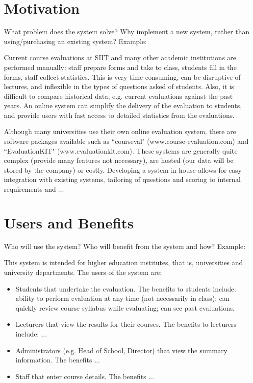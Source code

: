 \documentclass[12pt, a4paper]{report}
\begin{document}
\section{Motivation}
\label{sec:motivation}

What problem does the system solve? Why implement a new system, rather than using/purchasing an existing system? Example:

Current course evaluations at SIIT and many other academic institutions are performed manually: staff prepare forms and take to class, students fill in the forms, staff collect statistics. This is very time consuming, can be disruptive of lectures, and inflexible in the types of questions asked of students. Also, it is difficult to compare historical data, e.g. current evaluations against the past years. An online system can simplify the delivery of the evaluation to students, and provide users with fast access to detailed statistics from the evaluations.

Although many universities use their own online evaluation system, there are software packages available such as ``courseval" (www.course-evaluation.com) and ``EvaluationKIT" (www.evaluationkit.com). These systems are generally quite complex (provide many features not necessary), are hosted (our data will be stored by the company) or costly. Developing a system in-house allows for easy integration with existing systems, tailoring of questions and scoring to internal requirements and ...

\section{Users and Benefits}
\label{sec:users}

Who will use the system? Who will benefit from the system and how? Example:

This system is intended for higher education institutes, that is, universities and university departments. The users of the system are:

\begin{itemize}
	\item Students that undertake the evaluation. The benefits to students include: ability to perform evaluation at any time (not necessarily in class); can quickly review course syllabus while evaluating; can see past evaluations.
	\item Lecturers that view the results for their courses. The benefits to lecturers include: ...
	\item Administrators (e.g. Head of School, Director) that view the summary information. The benefits ...
	\item Staff that enter course details. The benefits ...

\end{itemize}
\end{document}
